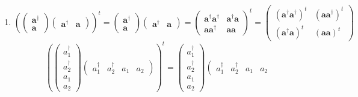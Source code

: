 \documentclass[aps,preprint]{revtex4}
\begin{document}
\begin{enumerate}
\item 
\begin{equation}
\left( \left( 
\begin{array}{c}
\boldsymbol{a}^{\dagger } \\ 
\boldsymbol{a}%
\end{array}%
\right) \left( 
\begin{array}{cc}
\boldsymbol{a}^{\dagger } & \boldsymbol{a}%
\end{array}%
\right) \right) ^{t}=\left( 
\begin{array}{c}
\boldsymbol{a}^{\dagger } \\ 
\boldsymbol{a}%
\end{array}%
\right) \left( 
\begin{array}{cc}
\boldsymbol{a}^{\dagger } & \boldsymbol{a}%
\end{array}%
\right) =\left( 
\begin{array}{cc}
\boldsymbol{a}^{\dagger }\boldsymbol{a}^{\dagger } & \boldsymbol{a}^{\dagger
}\boldsymbol{a} \\ 
\boldsymbol{aa}^{\dagger } & \boldsymbol{aa}%
\end{array}%
\right) ^{t}=\left( 
\begin{array}{cc}
\left( \boldsymbol{a}^{\dagger }\boldsymbol{a}^{\dagger }\right) ^{t} & 
\left( \boldsymbol{aa}^{\dagger }\right) ^{t} \\ 
\left( \boldsymbol{a}^{\dagger }\boldsymbol{a}\right) ^{t} & \left( 
\boldsymbol{aa}\right) ^{t}%
\end{array}%
\right)
\end{equation}%
\begin{equation}
\left( \left( 
\begin{array}{c}
a_{1}^{\dagger } \\ 
a_{2}^{\dagger } \\ 
a_{1} \\ 
a_{2}%
\end{array}%
\right) \left( 
\begin{array}{cccc}
a_{1}^{\dagger } & a_{2}^{\dagger } & a_{1} & a_{2}%
\end{array}%
\right) \right) ^{t}=\left( 
\begin{array}{c}
a_{1}^{\dagger } \\ 
a_{2}^{\dagger } \\ 
a_{1} \\ 
a_{2}%
\end{array}%
\right) \left( 
\begin{array}{cccc}
a_{1}^{\dagger } & a_{2}^{\dagger } & a_{1} & a_{2}%

\end{array}
\end{equation}
\end{enumerate}
\end{document}
